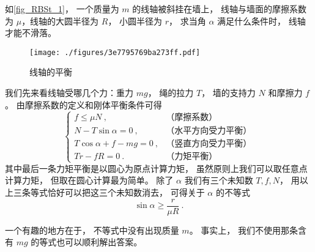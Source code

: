 \begin{example}{}\label{ex_RBSt_1}
如\autoref{fig_RBSt_1}， 一个质量为 $m$ 的线轴被斜挂在墙上， 线轴与墙面的摩擦系数为 $\mu$，线轴的大圆半径为 $R$， 小圆半径为 $r$， 求当角 $\alpha$ 满足什么条件时， 线轴才能不滑落。
\begin{figure}[ht]
\centering
\texttt{[image: ./figures/3e7795769ba273ff.pdf]}
\caption{线轴的平衡} \label{fig_RBSt_1}
\end{figure}

我们先来看线轴受哪几个力：重力 $mg$， 绳的拉力 $T$， 墙的支持力 $N$ 和摩擦力 $f$。 由摩擦系数的定义和刚体平衡条件可得
\begin{equation}
\begin{cases}
f \leqslant \mu N~, & \text{（摩擦系数）}\\
N - T\sin\alpha = 0~, & \text{（水平方向受力平衡）}\\
T\cos\alpha + f - mg = 0~, & \text{（竖直方向受力平衡）}\\
Tr - fR = 0~. & \text{（力矩平衡）}
\end{cases}
\end{equation}
其中最后一条力矩平衡是以圆心为原点计算力矩， 虽然原则上我们可以取任意点计算力矩， 但取在圆心计算最为简单。 除了 $\alpha$ 我们有三个未知数 $T, f, N$， 用以上三条等式恰好可以把这三个未知数消去， 可得关于 $\alpha$ 的不等式
\begin{equation}
\sin\alpha \geqslant \frac{r}{\mu R}~.
\end{equation}

一个有趣的地方在于， 不等式中没有出现质量 $m$。 事实上， 我们不使用那条含有 $mg$ 的等式也可以顺利解出答案。
\end{example}

